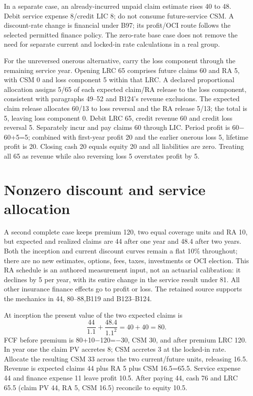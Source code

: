 In a separate case, an already-incurred unpaid claim estimate rises 40 to 48. Debit service expense 8/credit LIC 8; do not consume future-service CSM. A discount-rate change is financial under B97; its profit/OCI route follows the selected permitted finance policy. The zero-rate base case does not remove the need for separate current and locked-in rate calculations in a real group.

For the unreversed onerous alternative, carry the loss component through the remaining service year. Opening LRC 65 comprises future claims 60 and RA 5, with CSM 0 and loss component 5 within that LRC. A declared proportional allocation assigns 5/65 of each expected claim/RA release to the loss component, consistent with paragraphs 49--52 and B124's revenue exclusions. The expected claim release allocates 60/13 to loss reversal and the RA release 5/13; the total is 5, leaving loss component 0. Debit LRC 65, credit revenue 60 and credit loss reversal 5. Separately incur and pay claims 60 through LIC. Period profit is 60\ensuremath{-}60+5=5; combined with first-year profit 20 and the earlier onerous loss 5, lifetime profit is 20. Closing cash 20 equals equity 20 and all liabilities are zero. Treating all 65 as revenue while also reversing loss 5 overstates profit by 5.

\hypertarget{nonzero-discount-and-service-allocation}{%
\section{Nonzero discount and service allocation}\label{method-insurance-methods-nonzero-discount-and-service-allocation}}

A second complete case keeps premium 120, two equal coverage units and RA 10, but expected and realized claims are 44 after one year and 48.4 after two years. Both the inception and current discount curves remain a flat 10\% throughout; there are no new estimates, options, fees, taxes, investments or OCI election. This RA schedule is an authored measurement input, not an actuarial calibration: it declines by 5 per year, with its entire change in the service result under 81. All other insurance finance effects go to profit or loss. The retained source supports the mechanics in 44, 80--88,B119 and B123--B124.

At inception the present value of the two expected claims is
\[
 \frac{44}{1.1}+\frac{48.4}{1.1^2}=40+40=80.
\]
 FCF before premium is 80+10\ensuremath{-}120=\ensuremath{-}30, CSM 30, and after premium LRC 120. In year one the claim PV accretes 8; CSM accretes 3 at the locked-in rate. Allocate the resulting CSM 33 across the two current/future units, releasing 16.5. Revenue is expected claims 44 plus RA 5 plus CSM 16.5=65.5. Service expense 44 and finance expense 11 leave profit 10.5. After paying 44, cash 76 and LRC 65.5 (claim PV 44, RA 5, CSM 16.5) reconcile to equity 10.5.

